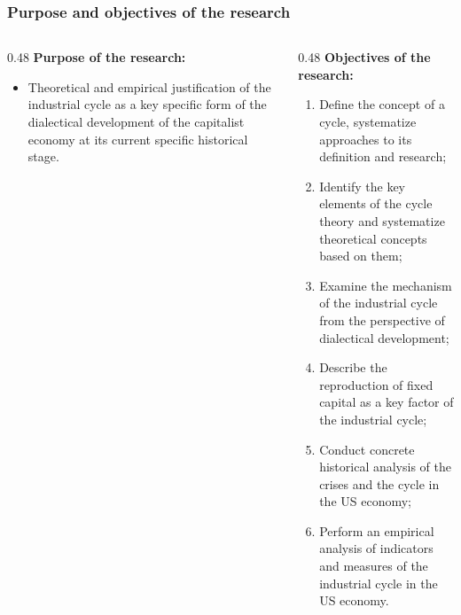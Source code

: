 \begin{frame}
  \frametitle{Purpose and objectives of the research}
  \begin{columns}[T,onlytextwidth]
    \begin{column}{0.48\textwidth}
      \textbf{Purpose of the research:}
      \begin{itemize}
        \item Theoretical and empirical justification of the industrial cycle as a key specific form of the dialectical development of the capitalist economy at its current specific historical stage.
      \end{itemize}
    \end{column}

    \begin{column}{0.48\textwidth}
      \textbf{Objectives of the research:}
      \begin{enumerate}
        \item Define the concept of a cycle, systematize approaches to its definition and research;
        \item Identify the key elements of the cycle theory and systematize theoretical concepts based on them;
        \item Examine the mechanism of the industrial cycle from the perspective of dialectical development;
        \item Describe the reproduction of fixed capital as a key factor of the industrial cycle;
        \item Conduct concrete historical analysis of the crises and the cycle in the US economy;
        \item Perform an empirical analysis of indicators and measures of the industrial cycle in the US economy.
      \end{enumerate}
    \end{column}
  \end{columns}
\end{frame}

